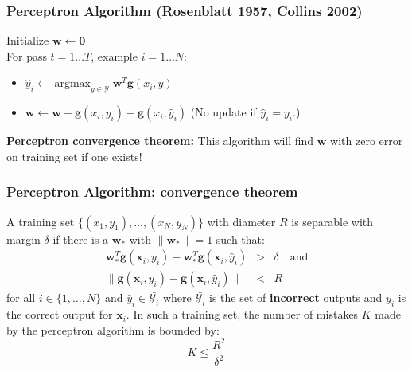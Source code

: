 \documentclass[ignorenonframetext,plain]{beamer}
\DeclareMathOperator*{\argmax}{argmax}
\renewcommand{\vec}{\mathbf}
\begin{document}
\begin{frame}\frametitle{Perceptron Algorithm (Rosenblatt 1957,
    Collins 2002)} %
Initialize $\vec{w} \leftarrow \vec{0}$\\
For pass $t=1\dots T$, example $i=1\dots N$:\\
\begin{itemize}
\item $\hat{y}_i \leftarrow \argmax_{y\in\mathcal{Y}}
    \vec{w}^T\vec{g}(x_i, y)$
\item $\vec{w} \leftarrow \vec{w} 
+\vec{g}(x_i,y_i)
-\vec{g}(x_i,\hat{y}_i)$ 
\hspace{10mm}
\small (No update if $\hat{y}_i=y_i$.)
\end{itemize}
\vspace{5mm}
{\bf Perceptron convergence theorem:} This algorithm will find
$\vec{w}$ with zero error on training set if one exists!
\end{frame}

\begin{frame}\frametitle{Perceptron Algorithm: convergence theorem}
A training set $\{(x_1,y_1),\dots,(x_N,y_N)\}$ with diameter $R$ is
separable with margin $\delta$ if there is a $\vec{w}_*$ with
$\|\vec{w}_*\|=1$ such that: \begin{eqnarray*}
  \vec{w}_*^T\vec{g}(\vec{x}_i,y_i) - \vec{w}_*^T\vec{g}(\vec{x}_i,\hat{y}_i)
  &>& \delta \quad\text{and}\\ \|\vec{g}(\vec{x}_i, y_i) -
  \vec{g}(\vec{x}_i, \hat{y}_i)\| &<& R
\end{eqnarray*}
for all $i \in \{1,\dots,N\}$ and $\hat{y}_i \in \bar{\mathcal{Y}_i}$ where
$\bar{\mathcal{Y}_i}$ is the set of {\bf incorrect} outputs and $y_i$
is the correct output for $\vec{x}_i$.  In such a training set, the
number of mistakes $K$ made by the perceptron algorithm is bounded
by: \[ K \leq \frac{R^2}{\delta^2}
\]
\end{frame}
\end{document}
